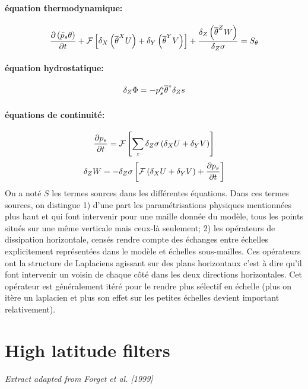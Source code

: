 \paragraph{\'equation thermodynamique:}
%
\begin{equation}
\label{eq:thermo}
\frac{\partial \left( \tilde{p}_s \theta \right)}{\partial t}
+{\cal F}\left[ \delta_X \left( {\overline{\theta}}^{ X }U \right) +\delta_Y \left( {\overline{\theta}}^{ Y }V \right)  \right]
+\frac{\delta_Z \left( {\overline{\theta}}^{ Z } W \right)}{\delta_Z \sigma}=S_\theta
\end{equation}
%
\paragraph{\'equation hydrostatique:}
\begin{equation}
\delta_Z \Phi=-p_s^\kappa  {\overline{\theta}}^{ z } \delta_Z s
\end{equation}
%
\paragraph{\'equations de continuit\'e:}
%
\begin{equation}
\label{eq:cont1}
\frac{\partial p_s}{\partial t}  = {\cal F}\left[ \sum_z{\delta_Z \sigma \left( \delta_X U+ \delta_Y V \right)} \right]
\end{equation}
\begin{equation}
\label{eq:cont2}
\delta_Z W   = -\delta_Z \sigma \left[ {\cal F}\left( \delta_X U+ \delta_Y V \right) + \frac{\partial p_s}{\partial t} \right]
\end{equation}
%
On a not\'e $S$ les termes sources dans les diff\'erentes \'equations.
Dans ces termes sources, on distingue 1) d'une part les param\'etrisations physiques mentionn\'ees plus haut et qui font intervenir pour une maille donn\'ee du mod\`ele, tous les points situ\'es sur une m\^eme verticale mais ceux-l\`a seulement; 2) les op\'erateurs de dissipation horizontale, cens\'es rendre compte des \'echanges entre \'echelles explicitement repr\'esent\'ees dans le mod\`ele et \'echelles sous-mailles. Ces op\'erateurs ont la structure de Laplaciens agissant sur des plans horizontaux c'est \`a dire qu'il font intervenir un voisin de chaque c\^ot\'e dans les deux directions horizontales. Cet op\'erateur est g\'en\'eralement it\'er\'e pour le rendre plus s\'electif en \'echelle (plus on it\`ere un laplacien et plus son effet sur les petites \'echelles devient important relativement).

\section{High latitude filters}

{\it Extract adapted from Forget et al. [1999]}\\

